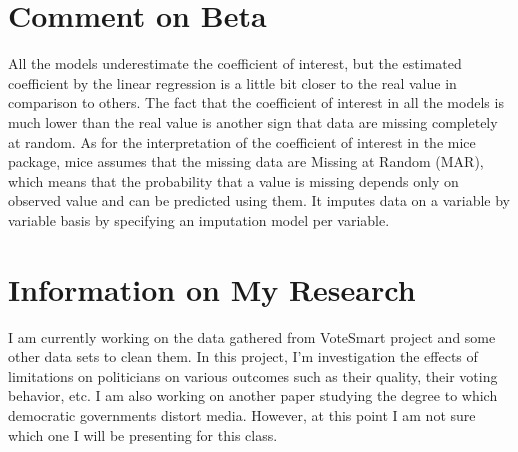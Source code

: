 \documentclass{article}
\begin{document}
\newpage

\section{Comment on Beta}

All the models underestimate the coefficient of interest, but the estimated coefficient by the linear regression is a little bit closer to the real value in comparison to others. The fact that the coefficient of interest in  all the models is much lower than the real value is another sign that data are missing completely  at random.  
As for the interpretation of the coefficient of interest in the mice package, mice assumes that the missing data are Missing at Random (MAR), which means that the probability that a value is missing depends only on observed value and can be predicted using them. It imputes data on a variable by variable basis by specifying an imputation model per variable.

\section{Information on My Research}
I am currently working on the data gathered from VoteSmart project and some other data sets to clean them. In this project, I'm investigation the effects of limitations on politicians on various outcomes such as their quality, their voting behavior, etc. I am also working on another paper studying the degree to which democratic governments distort media. However, at this point I am not sure which one I will be presenting for this class.
\end{document}
